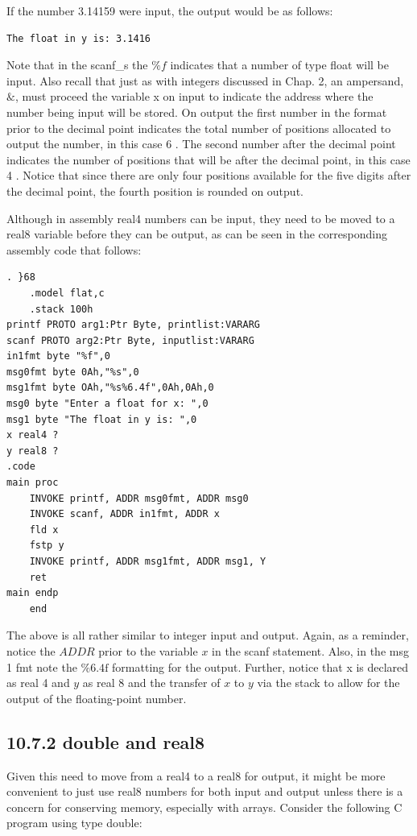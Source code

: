 \documentclass[10pt]{book}
\begin{document}
\begin{center}
\begin{center}
\begin{center}
\begin{center}
If the number 3.14159 were input, the output would be as follows:

\begin{verbatim}
The float in y is: 3.1416
\end{verbatim}

Note that in the scanf\_s the $\% f$ indicates that a number of type float will be input. Also recall that just as with integers discussed in Chap. 2, an ampersand, $\&$, must proceed the variable x on input to indicate the address where the number being input will be stored. On output the first number in the format prior to the decimal point indicates the total number of positions allocated to output the number, in this case 6 . The second number after the decimal point indicates the number of positions that will be after the decimal point, in this case 4 . Notice that since there are only four positions available for the five digits after the decimal point, the fourth position is rounded on output.

Although in assembly real4 numbers can be input, they need to be moved to a real8 variable before they can be output, as can be seen in the corresponding assembly code that follows:

\begin{verbatim}
. }68
    .model flat,c
    .stack 100h
printf PROTO arg1:Ptr Byte, printlist:VARARG
scanf PROTO arg2:Ptr Byte, inputlist:VARARG
in1fmt byte "%f",0
msg0fmt byte 0Ah,"%s",0
msg1fmt byte OAh,"%s%6.4f",0Ah,0Ah,0
msg0 byte "Enter a float for x: ",0
msg1 byte "The float in y is: ",0
x real4 ?
y real8 ?
.code
main proc
    INVOKE printf, ADDR msg0fmt, ADDR msg0
    INVOKE scanf, ADDR in1fmt, ADDR x
    fld x
    fstp y
    INVOKE printf, ADDR msg1fmt, ADDR msg1, Y
    ret
main endp
    end
\end{verbatim}

The above is all rather similar to integer input and output. Again, as a reminder, notice the $A D D R$ prior to the variable $x$ in the scanf statement. Also, in the msg 1 fmt note the $\% 6.4 \mathrm{f}$ formatting for the output. Further, notice that x is declared as real 4 and $y$ as real 8 and the transfer of $x$ to $y$ via the stack to allow for the output of the floating-point number.


\subsection*{10.7.2 double and real8}
Given this need to move from a real4 to a real8 for output, it might be more convenient to just use real8 numbers for both input and output unless there is a concern for conserving memory, especially with arrays. Consider the following C program using type double:


\end{center}
\end{center}
\end{center}
\end{center}
\end{document}
